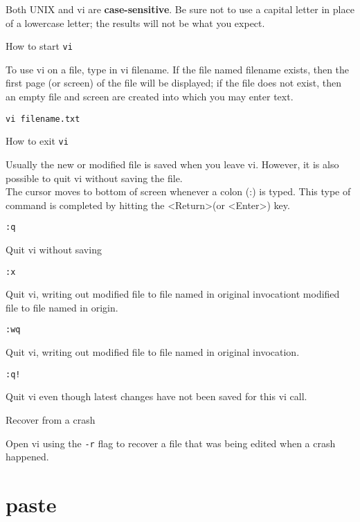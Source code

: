 \documentclass[hidelinks,12pt,a4paper,numbers=enddot]{scrartcl}
\begin{document}
Both UNIX and vi are \textbf{case-sensitive}. Be sure not to use a
capital letter in place of a lowercase letter; the
results will not be what you expect.


How to start \texttt{vi}


To use vi on a file, type in vi filename. If the file named
filename exists, then the first page (or screen) of the file
will be displayed; if the file does not exist, then an empty
file and screen are created into which you may enter text.

\begin{verbatim}
vi filename.txt
\end{verbatim}

How to exit \texttt{vi}

Usually the new or modified file is saved when you leave vi.
However, it is also possible to quit vi without saving the file.\\

The cursor moves to bottom of screen whenever a colon (:) is
typed. This type of command is completed by hitting the
\textless Return\textgreater  (or \textless Enter\textgreater ) key.\\

\begin{verbatim}
:q
\end{verbatim}

Quit vi without saving

\begin{verbatim}
:x
\end{verbatim}

Quit vi, writing out modified file to
file named in original invocationt modified file to file named in origin.

\begin{verbatim}
:wq
\end{verbatim}

Quit vi, writing out modified file to file named in original invocation.

\begin{verbatim}
:q!
\end{verbatim}

Quit vi even though latest changes have not been saved for this vi call.


Recover from a crash

Open vi using the \texttt{-r} flag to recover a file that was being edited when a crash
happened.

\section{paste}
\end{document}
